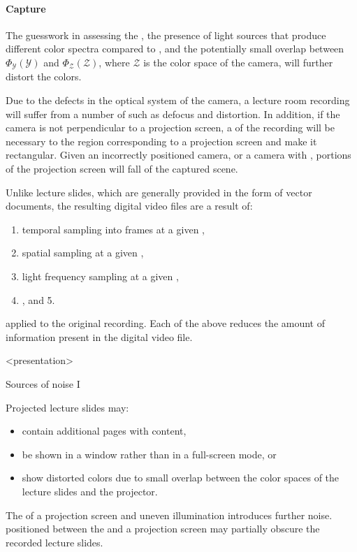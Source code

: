 \paragraph{Capture} The guesswork in assessing the ,
the presence of light sources that produce different color spectra compared to
, and the potentially small overlap between $\Phi_{\mathcal
Y}(\mathcal Y)$ and $\Phi_{\mathcal Z}(\mathcal Z)$, where $\mathcal Z$ is the
color space of the camera, will further distort the colors.

Due to the defects in the optical system of the camera, a lecture room
recording will suffer from a number of  such as defocus and
distortion. In addition, if the camera is not perpendicular to a projection
screen, a  of the recording will be necessary to
 the region corresponding to a projection screen and make it
rectangular. Given an incorrectly positioned camera, or a camera with
, portions of the projection screen will fall  of the captured scene.

Unlike lecture slides, which are generally provided in the form of vector
 documents, the resulting digital video files are a result of:
\begin{enumerate}
  \item temporal sampling into frames at a given ,
  \item spatial sampling at a given ,
  \item light frequency sampling at a given ,
  \item {}, and 5. 
\end{enumerate}
applied to the original recording. Each of the above reduces the amount of
information present in the digital video file.

\mode
<presentation>

\begin{frame}{Sources of noise I}
\begin{description}[<+->]
  \item[Projection]
    Projected lecture slides may:
    \begin{itemize}
      \item contain additional pages with  content,
      \item be shown in a window rather than in a full-screen mode, or
      \item show distorted colors due to small overlap between the color spaces
        of the lecture slides and the projector.
    \end{itemize}

  \item[Scene]
    The  of a projection screen and uneven illumination
    introduces further noise. 
     positioned between the  and a projection
    screen may partially obscure the recorded lecture slides.
\end{description}
\end{frame}

